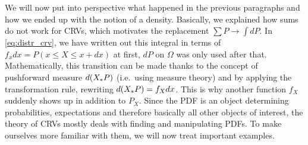 We will now put into perspective what happened in the previous paragraphs and how we ended up with the notion of a density. Basically, we explained how sums do not work for CRVs, which motivates the replacement $\sum P \rightarrow \int dP$. In \eqref{eq:distr_crv}, we have written out this integral in terms of $f_x dx =  P(x \leq X \leq x + dx)$ at first, $dP$ on $\Omega$ was only used after that. Mathematically, this transition can be made thanks to the concept of pushforward measure $d\qty(X_* P)$ (i.e.~using measure theory) and by applying the transformation rule, rewriting $d\qty(X_* P) = f_X dx$. This is why another function $f_X$ suddenly shows up in addition to $P_X$. Since the PDF is an object determining probabilities, expectations and therefore basically all other objects of interest, the theory of CRVs mostly deals with finding and manipulating PDFs. To make ourselves more familiar with them, we will now treat important examples. %


